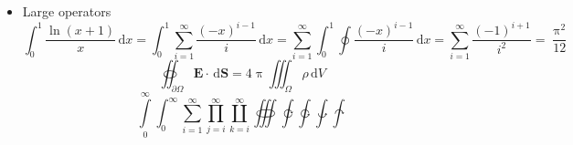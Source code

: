 \documentclass[11pt,fleqn]{article}
\def\Latinalphabets{ABCDEFGHIJKLMNOPQRSTUVWXYZ}
\def\latinalphabets{abcdefhgijklmnopqrstuvwxyz}
\def\Greekalphabets{%
  \Alpha      \Beta       \Gamma      \Delta      \Epsilon
  \Zeta       \Eta        \Theta      \varTheta   \Iota
  \Kappa      \Lambda     \Mu         \Nu         \Xi
  \Omicron    \Pi         \Rho        \Sigma      \Tau
  \Upsilon    \Phi        \Chi        \Psi        \Omega
}
\def\greekalphabets{%
  \alpha      \beta       \gamma      \delta      \epsilon \varepsilon
   \zeta       \eta        \theta      \vartheta 
  \iota       \kappa      \varkappa   \lambda     \mu
  \nu         \xi         \omicron    \pi \varpi        \rho
  \varrho     \sigma      \varsigma   \tau        \upsilon
  \phi        \varphi     \chi        \psi        \omega
}
\newcommand{\dd}{\,\mathrm{d}}
\begin{document}
\begin{itemize}
        

  \item Large operators
  \[\int_0^1\frac{\ln (x+1)}{x}\dd{x}=\int_0^1\sum_{i=1}^{\infty}\frac{(-x)^{i-1}}{i}\dd{x}=\sum_{i=1}^{\infty}\int_0^1\oint\frac{(-x)^{i-1}}{i}\dd{x}=\sum_{i=1}^{\infty}\frac{(-1)^{i+1}}{i^2}=\frac{\uppi^2}{12}\]
      \[\oiint_{\partial\Omega}\symbf{E}\cdot\dd{\symbf S}=4\uppi \iiint_{\Omega}\rho\dd{V}\]
        \[
          \int\limits_0^\infty \int_0^\infty
          \sum_{i=1}^\infty \prod_{j=i}^\infty \coprod_{k=i}^\infty
          \oiiint \varointclockwise \ointctrclockwise \awint \intclockwise
        \]


\end{itemize}
\end{document}
